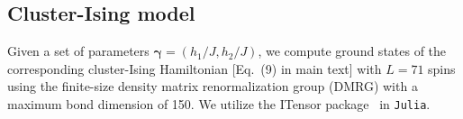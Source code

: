 \documentclass[twocolumn,aps,pra,superscriptaddress,tightlines,nofootinbib]{revtex4-2}
\begin{document}
	\subsection{Cluster-Ising model}
	Given a set of parameters $\bm{\gamma}=(h_{1}/J,h_{2}/J)$, we compute ground states of the corresponding cluster-Ising Hamiltonian [Eq.~(9) in main text] with $L = 71$ spins using the finite-size density matrix renormalization group (DMRG) with a maximum bond dimension of 150. We utilize the ITensor package~\cite{itensor} in \texttt{Julia}.
	
	
\end{document}
